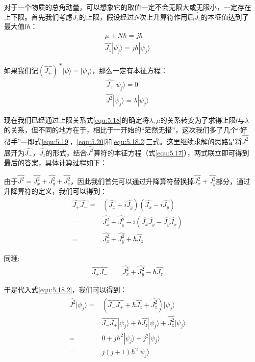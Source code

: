         对于一个物质的总角动量，可以想象它的取值一定不会无限大或无限小，一定存在上下限。首先我们考虑$\hat{J_z}$的上限，假设经过$N$次上升算符作用后$\hat{J_z}$的本征值达到了最大值$l\hbar$：
        \begin{align}\label{equ:5.18}
             \mu + N\hbar = j\hbar \\
             \hat{J_z}|\psi _j\rangle= j\hbar |\psi _j\rangle \label{equ:5.18.2}
        \end{align}
        
        如果我们记$(\hat{J_+})^N|\psi \rangle=|\psi _j\rangle$，那么一定有本征方程：
        \begin{align} \label{equ:5.19}
             \hat{J_+}|\psi _j\rangle= 0\\
             \hat{J^2}|\psi _j\rangle= \lambda|\psi _j\rangle \label{equ:5.20}
        \end{align} 
        
        现在我们已经通过上限关系式\ref{equ:5.18}的确定将$\lambda,\mu$的关系转变为了求得上限$l$与$\lambda$的关系，但不同的地方在于，相比于一开始的“茫然无措”，这次我们多了几个“好帮手”---即式\ref{equ:5.19}，\ref{equ:5.20}和\ref{equ:5.18.2}三式。这里继续求解的思路是将$\hat{J^2}$展开为$\hat{J_+}，\hat{J_z}$的形式，结合$\hat{J^2}$算符的本征方程（式\ref{equ:5.17}），两式联立即可得到最后的答案，具体计算过程如下：
        
        由于$\hat{J^2}=\hat{J_x^2}+\hat{J_y^2}+\hat{J_z^2}$，因此我们首先可以通过升降算符替换掉$\hat{J_x^2}+\hat{J_y^2}$部分，通过升降算符的定义，我们可以得到：
        \begin{align}
            \begin{split}\label{equ:5.22}
                \hat{J_+}\hat{J_-}=& (\hat{J_x }+ i \hat{J_y})(\hat{J_x}- i\hat{J_y})\\
                =&\hat{J_x^2}+\hat{J_y^2}-i(\hat{J_x}\hat{J_y}-\hat{J_y}\hat{J_x})\\
                =&\hat{J_x^2}+\hat{J_y^2}+\hbar \hat{J_z}
            \end{split}
        \end{align}
        
        同理:
        \begin{align}
             \hat{J_+}\hat{J_-}=& \hat{J_x^2}+\hat{J_y^2}- \hbar \hat{J_z}
        \end{align}
        
        于是代入式\ref{equ:5.18.2}，我们可以得到：
        \begin{align}\label{equ:5.24}
            \begin{split}
               \hat{J^2}|\psi_j \rangle=&(\hat{J_-}\hat{J_+} + \hbar \hat{J_z}+\hat{J_z^2})|\psi_j \rangle\\
               =&\hat{J_-}\hat{J_+}|\psi_j \rangle +\hbar \hat{J_z}|\psi_j \rangle+\hat{J_z^2}|\psi_j \rangle\\
               =& 0 +j\hbar^2 |\psi_j\rangle + j^2 |\psi_j \rangle\\
               =& j(j+1)\hbar^2 |\psi_j \rangle
            \end{split}
        \end{align}
        
